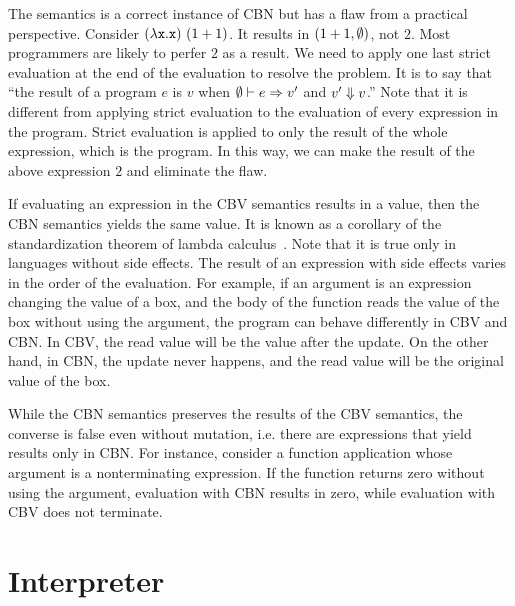 The semantics is a correct instance of CBN but has a flaw from a practical
perspective. Consider $(\lambda\texttt{x}.\texttt{x})\ (1+1)$. It results in
$(1+1,\emptyset)$, not $2$. Most programmers are likely to perfer
$2$ as a result. We need to apply one last strict evaluation at the end of the
evaluation to resolve the problem. It is to say that ``the result of a program
$e$ is $v$ when $\emptyset\vdash e\Rightarrow v'$ and $v'\Downarrow v$.'' Note that it is
different from applying strict evaluation to the evaluation of every expression
in the program. Strict evaluation is applied to only the result of the whole
expression, which is the program. In this way, we can make the result of the
above expression $2$ and eliminate the flaw.

If evaluating an expression in the CBV semantics results in a value,
then the CBN semantics yields the same value. It is known as a corollary of the
standardization theorem of lambda calculus~\cite{theories-of-pl}.
Note that it is true only in languages without side effects.
The result of an expression with side effects varies in the order of
the evaluation. For example, if an argument is an expression changing the value
of a box, and the body of the function reads the value of the box without using
the argument, the program can behave differently in CBV and CBN. In CBV, the
read value will be the value after the update. On the other hand, in CBN, the
update never happens, and the read value will be the original value of the box.

While the CBN semantics preserves the results of the CBV semantics,
the converse is false even without mutation, i.e. there are expressions that
yield results only in CBN.
For instance, consider a function application whose argument is a nonterminating
expression. If the function returns zero without using the argument, evaluation
with CBN results in zero, while evaluation with CBV does not terminate.

\section{Interpreter}

